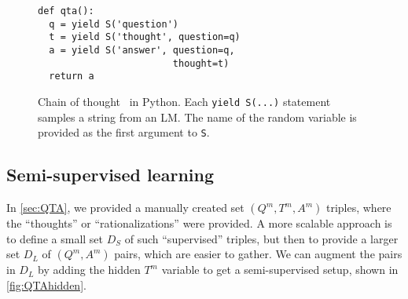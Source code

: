 %








  
\begin{figure}[h]
\begin{verbatim}
def qta():
  q = yield S('question')
  t = yield S('thought', question=q)
  a = yield S('answer', question=q, 
                        thought=t)
  return a
\end{verbatim}
\caption{Chain of thought \cascade\ in Python. Each \texttt{yield S(...)} statement samples a string from an LM. The name of the random variable is provided as the first argument to \texttt{S}.}
\label{fig:cot_cascade}
\end{figure}  

\subsection{Semi-supervised learning}
\label{sec:STAR}
In \cref{sec:QTA}, we provided a manually created set  $(Q^m,T^m,A^m)$ triples,
where the ``thoughts'' or ``rationalizations'' were provided.
A more scalable approach is to define a small set $D_S$
of such ``supervised'' triples,
but then to provide a larger set $D_L$ of $(Q^m,A^m)$ pairs,
which are easier to gather. %
We can augment the pairs in $D_L$ by adding 
the hidden $T^m$ variable to get a semi-supervised setup, shown in  
\cref{fig:QTAhidden}.

